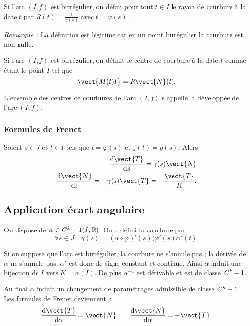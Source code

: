 \begin{defdef}
  Si l'arc $(I,f)$ est birrégulier, on défini pour tout $t \in I$ le rayon de courbure à la date $t$ par $R(t) = \frac{1}{\gamma(s)}$ avec $t=\varphi(s)$.
\end{defdef}

\emph{Remarque}~: La définition est légitime car en un point birrégulier la courbure est non nulle.

\begin{defdef}
  Si l'arc $(I,f)$ est birrégulier, on définit le centre de courbure à la date $t$ comme étant le point $I$ tel que
  \begin{equation}
    \vect{M(t)I} = R \vect{N}(t).
  \end{equation}
\end{defdef}
L'ensemble des centres de courbures de l'arc $(I, f)$ s'appelle la développée de l'arc $(I, f)$.

\subsubsection{Formules de Frenet}

Soient $s \in J$ et $t \in I$ tels que $t=\varphi(s)$ et $f(t)=g(s)$. Alors
\begin{align}
  \derived{\vect{T}}{s} = \gamma(s) \vect{N} \\
  \derived{\vect{N}}{s} = -\gamma(s)\vect{T}=-\frac{\vect{T}}{R}.
\end{align}

\subsection{Application écart angulaire}

On dispose de $\alpha \in \mathit{C}^k-1(I, \mathbb{R})$. On a défini la courbure par
\begin{equation}
  \forall s \in J \quad \gamma(s) = (\alpha \circ \varphi)'(s) ) \varphi'(s)\alpha'(t).
\end{equation}

Si on suppose que l'arc est birrégulier, la courbure ne s'annule pas ; la dérivée de $\alpha$ ne s'annule pas. $\alpha'$ est donc de signe constant et continue. Ainsi $\alpha$ induit une bijection de $I$ vers $K=\alpha(I)$. De plus $\alpha^{-1}$ est dérivable et est de classe $\mathit{C}^k-1$. 

Au final $\alpha$ induit un changement de paramétrages admissible de classe $\mathit{C}^k-1$. Les formules de Frenet deviennent~:
\begin{equation}
  \derived{\vect{T}}{\alpha}=\vect{N} \qquad \derived{\vect{N}}{\alpha}=-\vect{T}.
\end{equation}

